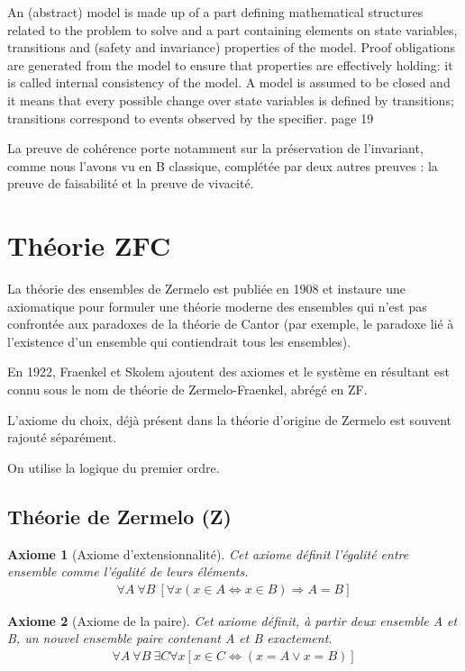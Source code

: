 \documentclass[10pt,a4paper]{article}
\newtheorem{axiom}{Axiome}[section]
\begin{document}
An (abstract) model is made up of a part defining mathematical structures
related to the problem to solve and a part containing elements on state variables,
transitions and (safety and invariance) properties of the model. Proof obligations
are generated from the model to ensure that properties are effectively holding: it
is called internal consistency of the model. A model is assumed to be closed and
it means that every possible change over state variables is defined by transitions;
transitions correspond to events observed by the specifier.
page 19


La preuve de cohérence porte
notamment sur la préservation de l'invariant, comme nous l’avons
vu en B classique, complétée par deux autres preuves : la preuve
de faisabilité et la preuve de vivacité.\cite{dossierTechnique}
\fi

\appendix

\section{Théorie ZFC}
\label{ZFC}
La théorie des ensembles de Zermelo est publiée en 1908 et instaure une axiomatique pour formuler une théorie moderne des ensembles qui n'est pas confrontée aux paradoxes de la théorie de Cantor (par exemple, le paradoxe lié à l'existence d'un ensemble qui contiendrait tous les ensembles).

En 1922, Fraenkel et Skolem ajoutent des axiomes et le système en résultant est connu sous le nom de théorie de Zermelo-Fraenkel, abrégé en ZF.

L'axiome du choix, déjà présent dans la théorie d'origine de Zermelo est souvent rajouté séparément.

On utilise la logique du premier ordre.

\subsection{Théorie de Zermelo (Z)}

\begin{axiom}[Axiome d'extensionnalité] Cet axiome définit l'égalité entre ensemble comme l'égalité de leurs éléments.
\begin{align}
\forall A\ \forall B \
\left[ 
\forall x \left( x \in A \Leftrightarrow x \in B  \right) \Rightarrow A = B
\right] 
\end{align}
\end{axiom}

\begin{axiom}[Axiome de la paire] Cet axiome définit, à partir deux ensemble A et B, un nouvel ensemble paire contenant A et B exactement.
\begin{align}
\forall A \ \forall B \ \exists C \forall x \left[ x \in C \Leftrightarrow \left( x = A \vee x = B \right) \right]
\end{align}
\end{axiom}
\end{document}
